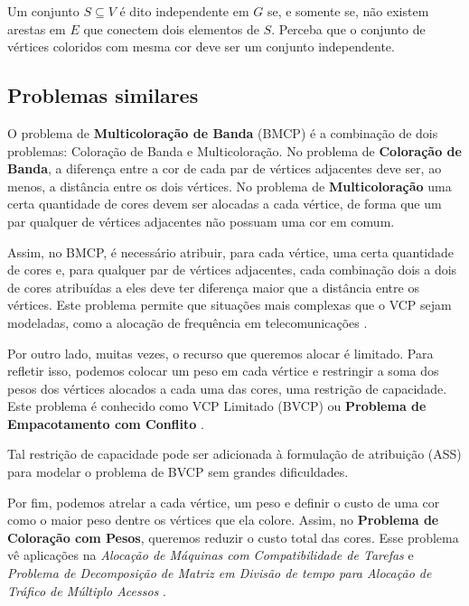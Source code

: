 \documentclass[11pt]{article}
\begin{document}
Um conjunto \(S \subseteq V\) é dito independente em \(G\) se, e somente se, não existem arestas em \(E\) que conectem dois elementos de \(S\).
Perceba que o conjunto de vértices coloridos com mesma cor deve ser um conjunto independente.

\subsection{Problemas similares}
\label{sec:org8a2e7af}
O problema de \textbf{Multicoloração de Banda} (BMCP) é a combinação de dois problemas: Coloração de Banda e Multicoloração.
No problema de \textbf{Coloração de Banda}, a diferença entre a cor de cada par de vértices adjacentes deve ser, ao menos, a distância entre os dois vértices.
No problema de \textbf{Multicoloração} uma certa quantidade de cores devem ser alocadas a cada vértice, de forma que um par qualquer de vértices adjacentes não possuam uma cor em comum.

Assim, no BMCP, é necessário atribuir, para cada vértice, uma certa quantidade de cores e, para qualquer par de vértices adjacentes, cada combinação dois a dois de cores atribuídas a eles deve ter diferença maior que a distância entre os vértices.
Este problema permite que situações mais complexas que o VCP sejam modeladas, como a alocação de frequência em telecomunicações \autocite{Aardal2007Modelssolutiontechniques}.

Por outro lado, muitas vezes, o recurso que queremos alocar é limitado.
Para refletir isso, podemos colocar um peso em cada vértice e restringir a soma dos pesos dos vértices alocados a cada uma das cores, uma restrição de capacidade.
Este problema é conhecido como VCP Limitado (BVCP) ou \textbf{Problema de Empacotamento com Conflito} \textcite{Connolly1990KnapsackProblemsAlgorithms}.

Tal restrição de capacidade pode ser adicionada à formulação de atribuição (ASS) para modelar o problema de BVCP sem grandes dificuldades.

Por fim, podemos atrelar a cada vértice, um peso e definir o custo de uma cor como o maior peso dentre os vértices que ela colore.
Assim, no \textbf{Problema de Coloração com Pesos}, queremos reduzir o custo total das cores.
Esse problema vê aplicações na \emph{Alocação de Máquinas com Compatibilidade de Tarefas} e \emph{Problema de Decomposição de Matriz em Divisão de tempo para Alocação de Tráfico de Múltiplo Acessos} \autocites{Werra1985introductiontimetabling}[][]{Escoffier2006WeightedColoringfurther}[][]{Finke2008Batchprocessinginterval}.
\end{document}
